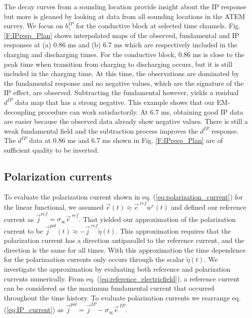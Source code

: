 \documentclass[extra,mreferee]{gji}
\newcommand{\siginf}{\sigma_\infty}
\renewcommand {\j}  { {\vec j} }
\newcommand {\e}  { {\vec e} }
\newcommand{\peta}{\tilde{\eta}}
\newcommand{\eref}{\e^{\ ref}}
\newcommand{\dip}{d^{IP}}
\begin{document}
The decay curves from a sounding location  provide insight about the IP response but more is gleaned by looking at data from all  sounding locations in the ATEM survey. We focus on $b_z^{IP}$ for the conductive block at selected time channels. Fig. \ref{F:IPresp_Plan} shows interpolated maps of the observed, fundamental and IP responses at (a) 0.86 ms and (b) 6.7 ms which are respectively included in the charging and discharging times. For the conductive block, 0.86 ms is close to the peak time when transition from charging to discharging occurs, but it is still included in the charging time.
At this time, the observations are dominated by the fundamental response and no negative values,  which are the signature of the IP effect, are observed. Subtracting the fundamental however, yields a residual $\dip$ data map that has a strong negative. This  example  shows that our EM-decoupling procedure can  work satisfactorily.  At 6.7 ms, obtaining good IP data are easier because the observed data already show negative values. There is still a weak fundamental field and the subtraction process improves the $\dip$ response. The $\dip$ data at  0.86 ms and 6.7 ms shown in Fig. \ref{F:IPresp_Plan} are of sufficient quality to be inverted.



\subsection{Polarization currents}
To evaluate the polarization current shown in eq. (\ref{eq:polarization_current}) for the linear functional, we assumed $\e(t) \approx \eref w^e(t)$ and defined our reference current as $\j^{ref}=\siginf \eref$. That yielded our approximation of the polarization current to be $\j^{pol}(t) \approx -\j^{\ ref} \peta(t)$. This approximation requires that the polarization current has a  direction antiparallel to the reference current, and the direction is the same for all times. With this approximation the time dependence for the polarizaation currents only occurs through the scalar $\peta(t)$. We investigate the approximation by evaluating both reference and polarization currents numerically.
From eq. (\ref{eq:reference_electricfield}), a reference current can be considered as the maximum fundamental current that occurred throughout the  time history.
To evaluate polarization currents we rearrange eq. (\ref{eq:IP_current}) as $\j^{pol} = \j^{IP} - \siginf\e^{\ IP}$.
\end{document}
